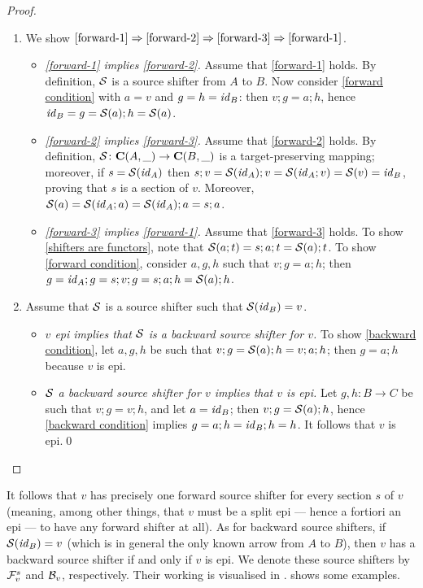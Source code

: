 \begin{fullorname}
\begin{proof}
\begin{enumerate}[topsep=\smallskipamount]
\item
We show $\ref{forward-1} \Rightarrow \ref{forward-2} \Rightarrow \ref{forward-3} \Rightarrow \ref{forward-1}$.
\begin{itemize}
\item \emph{\ref{forward-1} implies \ref{forward-2}.}
%
Assume that \ref{forward-1} holds. By definition, $\mathcal{S}$ is a source shifter from $A$ to $B$. Now consider \eqref{forward condition} with $a=v$ and $g=h=\mathit{id}_B$: then $v;g=a;h$, hence $\mathit{id}_B=g = \mathcal{S}(a);h=\mathcal{S}(a)$.

\item \emph{\ref{forward-2} implies \ref{forward-3}.}
%
Assume that \ref{forward-2} holds. By definition, $\mathcal{S} \colon \mathbf{C}(A,\_) \rightarrow \mathbf{C}(B, \_)$  is a target-preserving mapping; moreover, if $s=\mathcal{S}(\mathit{id}_A)$ then $s;v=\mathcal{S}(\mathit{id}_A);v=\mathcal{S}(\mathit{id}_A;v)=\mathcal{S}(v)=\mathit{id}_B$, proving that $s$ is a section of $v$. Moreover, $\mathcal{S}(a)=\mathcal{S}(\mathit{id}_A;a)=\mathcal{S}(\mathit{id}_A);a=s;a$.

\item \emph{\ref{forward-3} implies \ref{forward-1}.}
%
Assume that \ref{forward-3} holds. To show \eqref{shifters are functors}, note that $\mathcal{S}(a;t)=s;a;t=\mathcal{S}(a);t$. To show \eqref{forward condition}, consider $a,g,h$ such that $v;g=a;h$; then $g=\mathit{id}_A;g=s;v;g=s;a;h = \mathcal{S}(a);h$.
\end{itemize}

\item Assume that $\mathcal{S}$ is a source shifter such that $\mathcal{S}(\mathit{id}_B)=v$.
\begin{itemize}
\item \emph{$v$ epi implies that $\mathcal{S}$ is a backward source shifter for $v$.} To show \eqref{backward condition}, let $a,g,h$ be such that $v;g=\mathcal{S}(a);h=v;a;h$; then $g=a;h$ because $v$ is epi.

\item \emph{$\mathcal{S}$ a backward source shifter for $v$ implies that $v$ is epi.} Let $g,h:B\to C$ be such that $v;g=v;h$, and let $a=\mathit{id}_B$; then $v;g=\mathcal{S}(a);h$, hence \eqref{backward condition} implies $g=a;h=\mathit{id}_B;h=h$. It follows that $v$ is epi.\qed
\end{itemize}
\end{enumerate}
\end{proof}
\end{fullorname}
%
It follows that $v$ has precisely one forward source shifter for every section $s$ of $v$ (meaning, among other things, that $v$ must be a split epi --- hence a fortiori an epi --- to have any forward shifter at all). As for backward source shifters, if $\mathcal{S}(\mathit{id}_B)=v$ (which is in general the only known arrow from $A$ to $B$), then $v$ has a backward source shifter if and only if $v$ is epi. We denote these source shifters by $\mathcal{F}_v^s$ and $\mathcal{B}_v$, respectively. Their working is visualised in .  shows some examples.

